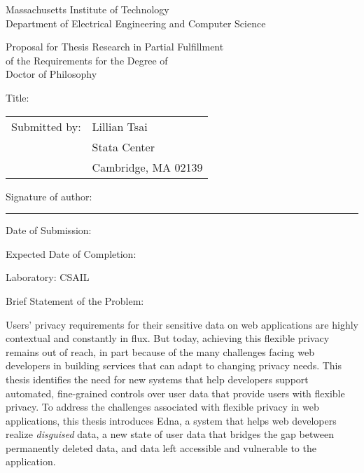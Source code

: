 
\begingroup


\begin{center}
Massachusetts Institute of Technology \\
Department of Electrical Engineering and Computer Science
\end{center}

\begin{center}
Proposal for Thesis Research in Partial Fulfillment \\
of the Requirements for the Degree of \\
Doctor of Philosophy
\end{center}

\vspace{1em}
\noindent Title: \mytitle

\vspace{1em}
\noindent\begin{tabular}{@{}ll}
Submitted by: & Lillian Tsai\\
              & Stata Center\\
              & Cambridge, MA 02139
\end{tabular}

\vspace{1em}
\noindent Signature of author: \rule{5cm}{0.1pt}

\vspace{1em}
\noindent Date of Submission: \mydate

\vspace{1em}
\noindent Expected Date of Completion: \mycompletion

\vspace{1em}
\noindent Laboratory: CSAIL 

\vspace{1em}
\noindent Brief Statement of the Problem:

\vspace{1em}
\begin{minipage}{\dimexpr\textwidth-1cm}

\noindent 
Users' privacy requirements for their sensitive data on web applications are
highly contextual and constantly in flux.
%
But today, achieving this flexible privacy remains out of reach, in part because
of the many challenges facing web developers in building services that can adapt
to changing privacy needs. 
%
This thesis identifies the need for new systems that help developers support
automated, fine-grained controls over user data that provide users with flexible
privacy. To address the challenges associated with flexible privacy in web applications,
this thesis introduces Edna, a system that helps web developers realize
\emph{disguised} data, a new state of user data that bridges the gap between
permanently deleted data, and data left accessible and vulnerable to the
application.
\end{minipage}

